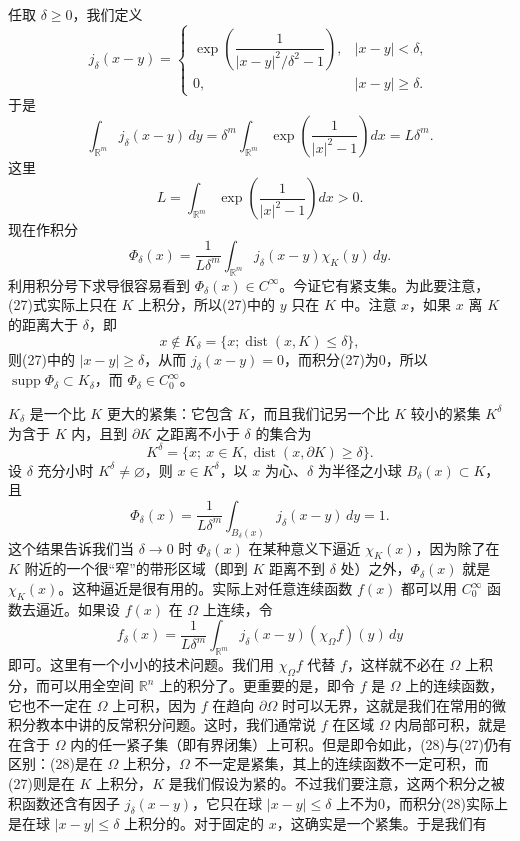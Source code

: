 任取 $\delta\ge0$，我们定义
\begin{equation}
 j_\delta(x-y)=
 \begin{cases}
 \exp\!\left(\dfrac{1}{|x-y|^2/\delta^2-1}\right),&|x-y|<\delta,\\[6pt]
 0,&|x-y|\ge\delta.
 \end{cases}
 \tag{26}
\end{equation}
于是
\[
 \int_{\mathbb R^m}j_\delta(x-y)\,dy
 =\delta^m\int_{\mathbb R^m}\exp\!\left(\frac1{|x|^2-1}\right)dx
 =L\delta^m.
\]
这里
\[
 L=\int_{\mathbb R^m}\exp\!\left(\frac1{|x|^2-1}\right)dx>0.
\]
现在作积分
\begin{equation}
 \Phi_\delta(x)=\frac1{L\delta^m}\int_{\mathbb R^m}j_\delta(x-y)\chi_K(y)\,dy.
 \tag{27}
\end{equation}
利用积分号下求导很容易看到 $\Phi_\delta(x)\in C^\infty$。今证它有紧支集。为此要注意，(27)式实际上只在 $K$ 上积分，所以(27)中的 $y$ 只在 $K$ 中。注意 $x$，如果 $x$ 离 $K$ 的距离大于 $\delta$，即
\[
 x\notin K_\delta=\{x;\operatorname{dist}(x,K)\le\delta\},
\]
则(27)中的 $|x-y|\ge\delta$，从而 $j_\delta(x-y)=0$，而积分(27)为0，所以 $\operatorname{supp}\Phi_\delta\subset K_\delta$，而 $\Phi_\delta\in C_0^\infty$。

$K_\delta$ 是一个比 $K$ 更大的紧集：它包含 $K$，而且我们记另一个比 $K$ 较小的紧集 $K^\delta$ 为含于 $K$ 内，且到 $\partial K$ 之距离不小于 $\delta$ 的集合为
\[
 K^\delta=\{x;\ x\in K,\operatorname{dist}(x,\partial K)\ge\delta\}.
\]
设 $\delta$ 充分小时 $K^\delta\ne\varnothing$，则 $x\in K^\delta$，以 $x$ 为心、$\delta$ 为半径之小球 $B_\delta(x)\subset K$，且
\[
 \Phi_\delta(x)=\frac1{L\delta^m}\int_{B_\delta(x)}j_\delta(x-y)\,dy=1.
\]
这个结果告诉我们当 $\delta\to0$ 时 $\Phi_\delta(x)$ 在某种意义下逼近 $\chi_K(x)$，因为除了在 $K$ 附近的一个很“窄”的带形区域（即到 $K$ 距离不到 $\delta$ 处）之外，$\Phi_\delta(x)$ 就是 $\chi_K(x)$。这种逼近是很有用的。实际上对任意连续函数 $f(x)$ 都可以用 $C_0^\infty$ 函数去逼近。如果设 $f(x)$ 在 $\Omega$ 上连续，令
\begin{equation}
 f_\delta(x)=\frac1{L\delta^m}\int_{\mathbb R^m}j_\delta(x-y)(\chi_\Omega f)(y)\,dy
 \tag{28}
\end{equation}
即可。这里有一个小小的技术问题。我们用 $\chi_\Omega f$ 代替 $f$，这样就不必在 $\Omega$ 上积分，而可以用全空间 $\mathbb R^n$ 上的积分了。更重要的是，即令 $f$ 是 $\Omega$ 上的连续函数，它也不一定在 $\Omega$ 上可积，因为 $f$ 在趋向 $\partial\Omega$ 时可以无界，这就是我们在常用的微积分教本中讲的反常积分问题。这时，我们通常说 $f$ 在区域 $\Omega$ 内局部可积，就是在含于 $\Omega$ 内的任一紧子集（即有界闭集）上可积。但是即令如此，(28)与(27)仍有区别：(28)是在 $\Omega$ 上积分，$\Omega$ 不一定是紧集，其上的连续函数不一定可积，而(27)则是在 $K$ 上积分，$K$ 是我们假设为紧的。不过我们要注意，这两个积分之被积函数还含有因子 $j_\delta(x-y)$，它只在球 $|x-y|\le\delta$ 上不为0，而积分(28)实际上是在球 $|x-y|\le\delta$ 上积分的。对于固定的 $x$，这确实是一个紧集。于是我们有

